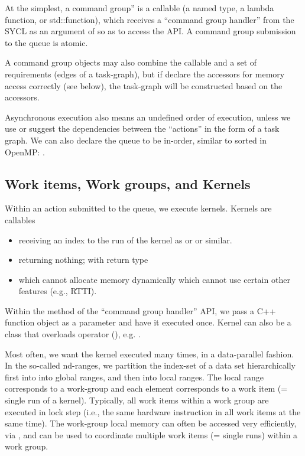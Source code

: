 At the simplest, a command group'' is a callable (a named type, a lambda function, or std::function), which receives a ``command group handler'' from the SYCL as an argument of  so as to access the API. 
A command group submission to the queue is atomic.  

A command group objects may also combine the callable and a set of requirements (edges of a task-graph), but if declare the accessors for memory access correctly (see below), the task-graph will be constructed based on the accessors. 

Asynchronous execution also means an undefined order of execution, 
unless we use  or suggest the dependencies between the ``actions'' in the form of a task graph.
We can also declare the queue to be in-order, similar to sorted in OpenMP:
.


 \subsection{Work items, Work groups, and Kernels}

Within an action submitted to the queue, we execute kernels.
 Kernels are callables 
 \begin{itemize}
 \item receiving an index to the run of the kernel as  or  or similar.
 \item returning nothing; with  return type 
 \item which cannot allocate memory dynamically
 \itme which cannot use certain other features (e.g., RTTI). 
\end{itemize}
Within the  method of the ``command group handler'' API, 
we pass a C++ function object as a parameter and have it executed once. 
Kernel can also be a class that overloads operator (), e.g. .

Most often, we want the kernel executed many times, in a data-parallel fashion. 
In the so-called nd-ranges, we partition the index-set of a data set hierarchically first into into global ranges, and then into local ranges. 
The local range corresponds to a work-group and each element corresponds to a work item (= single run of a kernel). 
Typically, all work items within a work group are executed in lock step (i.e., the same hardware instruction in all work items at the same time).
The work-group local memory can often be accessed very efficiently, via , and can be used to coordinate multiple work items (= single runs) within a work group.

